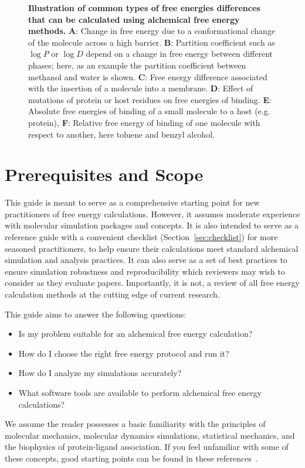 \documentclass[9pt,bestpractices]{livecoms}
\begin{document}
\begin{figure}
    \caption{\textbf{Illustration of common types of free energies differences that can be calculated using alchemical free energy methods.} \textbf{A}: Change in free energy due to a conformational change of the molecule across a high barrier. \textbf{B}: Partition coefficient such as $\log P$ or $\log D$ depend on a change in free energy between different phases; here, as an example the partition coefficient between methanol and water is shown. \textbf{C}: Free energy difference associated with the insertion of a molecule into a membrane. \textbf{D}: Effect of mutations of protein or host residues on free energies of binding. \textbf{E}: Absolute free energies of binding of a small molecule to a host (e.g. protein), \textbf{F}: Relative free energy of binding of one molecule with respect to another, here toluene and benzyl alcohol.
    \label{fig:fig_what_is_alchemy}
    }
\end{figure}
%
\section{Prerequisites and Scope}
\label{sec:pre}
This guide is meant to serve as a comprehensive starting point for new practitioners of free energy calculations.  However, it assumes moderate experience with molecular simulation packages and concepts.  It is also intended to serve as a reference guide with a convenient checklist (Section~\ref{sec:checklist}) for more seasoned practitioners, to help ensure their calculations meet standard alchemical simulation and analysis practices. It can also serve as a set of best practices to ensure simulation robustness and reproducibility which reviewers may wish to consider as they evaluate papers. Importantly, it is not, a review of all free energy calculation methods at the cutting edge of current research.

This guide aims to answer the following questions:
\begin{itemize}
    \item Is my problem suitable for an alchemical free energy calculation? 
    \item How do I choose the right free energy protocol and run it? 
    \item How do I analyze my simulations accurately? 
    \item What software tools are available to perform alchemical free energy calculations? 
\end{itemize}
%
We assume the reader possesses a basic familiarity with the principles of molecular mechanics, molecular dynamics simulations, statistical mechanics, and the biophysics of protein-ligand association. If you feel unfamiliar with some of these concepts, good starting points can be found in these references~\cite{braun2019best, grossfield2018best, klimovich2015guidelines, shirts2012best}. 
\end{document}
